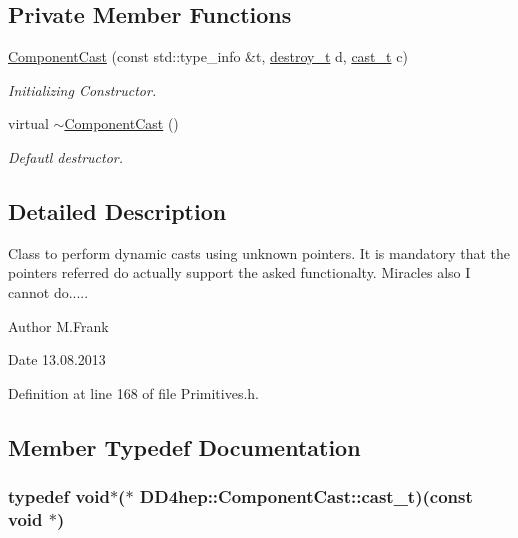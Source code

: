 \subsection*{Private Member Functions}
\begin{DoxyCompactItemize}
\item 
\hyperlink{class_d_d4hep_1_1_component_cast_a6a1068534a7f7287cd1f4a342c34a91a}{ComponentCast} (const std::type\_\-info \&t, \hyperlink{class_d_d4hep_1_1_component_cast_a60cfc51ff4c1b324e86c3f6b4bf4ba55}{destroy\_\-t} d, \hyperlink{class_d_d4hep_1_1_component_cast_a8d1ee595a10ab3382d1c7dc1b8987c1f}{cast\_\-t} c)
\begin{DoxyCompactList}\small\item\em Initializing Constructor. \item\end{DoxyCompactList}\item 
virtual \hyperlink{class_d_d4hep_1_1_component_cast_a1554d35b906921cba45fc717702ff8c4}{$\sim$ComponentCast} ()
\begin{DoxyCompactList}\small\item\em Defautl destructor. \item\end{DoxyCompactList}\end{DoxyCompactItemize}


\subsection{Detailed Description}
Class to perform dynamic casts using unknown pointers. It is mandatory that the pointers referred do actually support the asked functionalty. Miracles also I cannot do.....

\begin{DoxyAuthor}{Author}
M.Frank 
\end{DoxyAuthor}
\begin{DoxyDate}{Date}
13.08.2013 
\end{DoxyDate}


Definition at line 168 of file Primitives.h.

\subsection{Member Typedef Documentation}
\hypertarget{class_d_d4hep_1_1_component_cast_a8d1ee595a10ab3382d1c7dc1b8987c1f}{
\subsubsection[{cast\_\-t}]{\setlength{\rightskip}{0pt plus 5cm}typedef void$\ast$($\ast$ {\bf DD4hep::ComponentCast::cast\_\-t})(const void $\ast$)}}
\label{class_d_d4hep_1_1_component_cast_a8d1ee595a10ab3382d1c7dc1b8987c1f}


